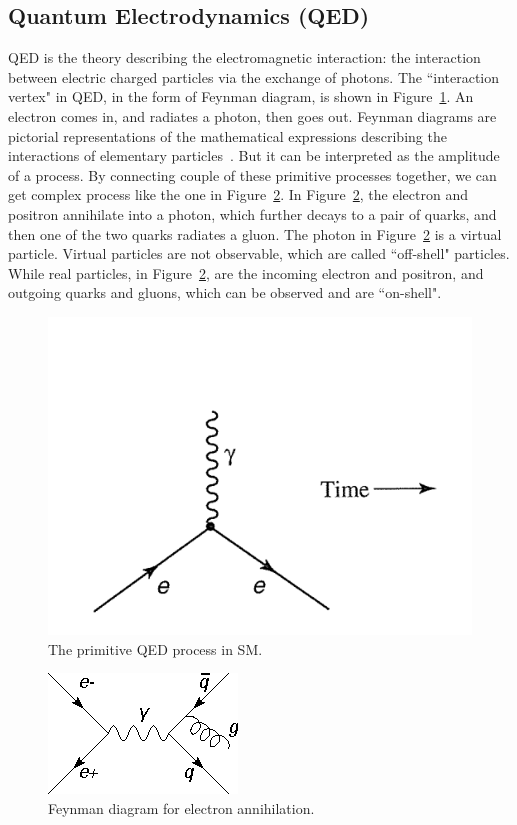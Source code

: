 
\subsection{Quantum Electrodynamics (QED)}

QED is the theory describing the electromagnetic interaction: the 
interaction between electric charged particles via the exchange of photons. 
The ``interaction vertex" in QED, in the form of Feynman diagram, is shown in 
Figure~\ref{fig:primitiveQED}. 
An electron comes in, and radiates a photon, then goes out. 
Feynman diagrams are pictorial representations of the mathematical expressions describing the interactions of elementary particles~\cite{feynman}.  But it can be interpreted as the amplitude of a process. 
By connecting couple of these primitive processes together, we can get complex process like the one in
Figure~\ref{fig:gluonradiation}. In Figure~\ref{fig:gluonradiation}, the electron and positron annihilate into a
photon, which further decays to a pair of quarks, and then one of the two quarks radiates a gluon. 
The photon in Figure~\ref{fig:gluonradiation} is a virtual particle. Virtual particles are not
observable, which are called ``off-shell" particles. While real particles, in Figure~\ref{fig:gluonradiation}, 
are the incoming electron and positron, and outgoing quarks and gluons, which can be observed and
are ``on-shell". 
 
\begin{figure}[!htbp]
\centering
\includegraphics[width=.7\textwidth]{figures/primitiveQED.png}
\caption{The primitive QED process in SM. }
\label{fig:primitiveQED}
\end{figure} 

 
\begin{figure}[!htbp]
\centering
\includegraphics[width=.5\textwidth]{figures/Radiate_gluon.png}
\caption{Feynman diagram for electron annihilation.}
\label{fig:gluonradiation}
\end{figure} 


